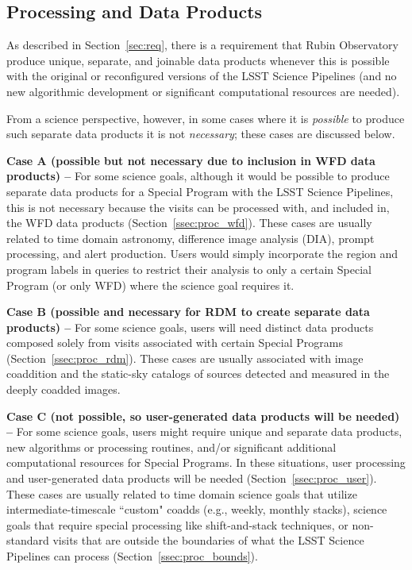 \subsection{Processing and Data Products}

As described in Section~\ref{sec:req}, there is a requirement that 
Rubin Observatory produce unique, separate, and joinable data products 
whenever this is possible with the original or reconfigured versions of the 
LSST Science Pipelines (and no new algorithmic development or significant 
computational resources are needed).

From a science perspective, however, in some cases where it is \emph{possible} 
to produce such separate data products it is not \emph{necessary}; these
cases are discussed below.

\textbf{Case A (possible but not necessary due to inclusion in WFD data products) -- } 
For some science goals, although it would be possible to produce separate 
data products for a Special Program with the LSST Science Pipelines, this 
is not necessary because the visits can be processed with, and included in, 
the WFD data products (Section~\ref{ssec:proc_wfd}).
These cases are usually related to time domain astronomy, difference image
analysis (DIA), prompt processing, and alert production.
Users would simply incorporate the region and program labels in queries to restrict 
their analysis to only a certain Special Program (or only WFD) where the 
science goal requires it.

\textbf{Case B (possible and necessary for RDM to create separate data products) -- }
For some science goals, users will need distinct data products composed solely from visits associated with certain Special Programs (Section~\ref{ssec:proc_rdm}).
These cases are usually associated with image coaddition and the static-sky catalogs 
of sources detected and measured in the deeply coadded images. 

\textbf{Case C (not possible, so user-generated data products will be needed) -- }
For some science goals, users might require unique and separate data products, 
new algorithms or processing routines, and/or significant additional 
computational resources for Special Programs.
In these situations, user processing and user-generated data products will be 
needed (Section~\ref{ssec:proc_user}).
These cases are usually related to time domain science goals that utilize 
intermediate-timescale ``custom" coadds (e.g., weekly, monthly stacks), 
science goals that require special processing like shift-and-stack techniques, 
or non-standard visits that are outside the boundaries of what the LSST
Science Pipelines can process (Section~\ref{ssec:proc_bounds}).


